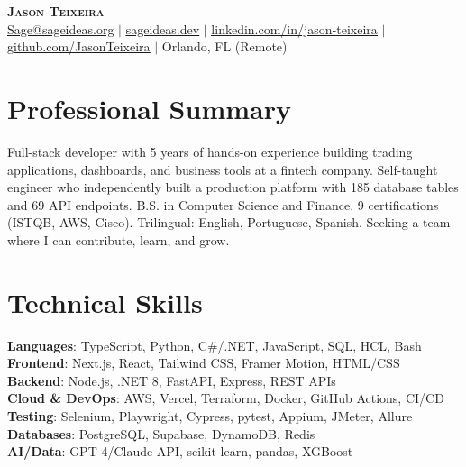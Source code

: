 \documentclass[letterpaper,11pt]{article}
\begin{document}
\begin{center}
    \textbf{\Huge \scshape Jason Teixeira} \\ \vspace{1pt}
    \small \href{mailto:Sage@sageideas.org}{ \underline{Sage@sageideas.org}} $|$
    \href{https://sageideas.dev}{ \underline{sageideas.dev}} $|$
    \href{https://www.linkedin.com/in/jason-teixeira/}{ \underline{linkedin.com/in/jason-teixeira}} $|$
    \href{https://github.com/JasonTeixeira}{ \underline{github.com/JasonTeixeira}} $|$
    Orlando, FL (Remote)
\end{center}

\section{Professional Summary}
  \small{Full-stack developer with 5 years of hands-on experience building trading applications, dashboards, and business tools at a fintech company. Self-taught engineer who independently built a production platform with 185 database tables and 69 API endpoints. B.S. in Computer Science and Finance. 9 certifications (ISTQB, AWS, Cisco). Trilingual: English, Portuguese, Spanish. Seeking a team where I can contribute, learn, and grow.}

\section{Technical Skills}
 \begin{itemize}[leftmargin=0.15in, label={}]
    \small{\item{
     \textbf{Languages}{: TypeScript, Python, C\#/.NET, JavaScript, SQL, HCL, Bash} \\
     \textbf{Frontend}{: Next.js, React, Tailwind CSS, Framer Motion, HTML/CSS} \\
     \textbf{Backend}{: Node.js, .NET 8, FastAPI, Express, REST APIs} \\
     \textbf{Cloud \& DevOps}{: AWS, Vercel, Terraform, Docker, GitHub Actions, CI/CD} \\
     \textbf{Testing}{: Selenium, Playwright, Cypress, pytest, Appium, JMeter, Allure} \\
     \textbf{Databases}{: PostgreSQL, Supabase, DynamoDB, Redis} \\
     \textbf{AI/Data}{: GPT-4/Claude API, scikit-learn, pandas, XGBoost}
    }}
 \end{itemize}
\end{document}
